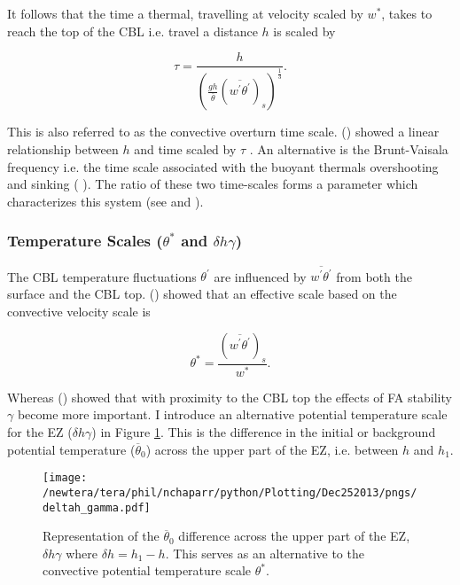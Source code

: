 It follows that the time a thermal, travelling at velocity scaled by $w^{*}$, takes to reach the top of the \acs{CBL} i.e. travel a distance $h$ is scaled by

\begin{equation}
\tau = \frac{h}{\left( \frac{gh}{\overline{\theta}}(\overline{w^{'}\theta^{'}})_{s} \right)^{\frac{1}{3}}}.
\end{equation}

 This is also referred to as the convective overturn time scale.  \citeauthor{SullMoengStev} (\citeyear{SullMoengStev}) 
showed a linear relationship between $h$ and time scaled by $\tau$ . An alternative is the Brunt-Vaisala frequency i.e. the time scale
 associated with the buoyant thermals overshooting and sinking (\citeauthor{FedConzMir04} \citeyear{FedConzMir04}).  The ratio of these two time-scales forms a parameter which characterizes this system (see \citeauthor{Sorbjan1}\citeyear{Sorbjan1} and \citeauthor{Deardorff79} \citeyear{Deardorff79}). 

\subsubsection{Temperature Scales ($\theta^{*}$ and $\delta h \gamma$)}
\label{subsubsec:tempscales}

The \acs{CBL} temperature fluctuations $\theta^{'}$ are influenced by $\overline{w^{'}\theta^{'}}$ from both the surface and the \acs{CBL} top.
\citeauthor {Deardorff70} (\citeyear{Deardorff70}) showed that an effective scale based on the convective velocity scale is

\begin{equation}
\theta^{*} = \frac{(\overline{w^{'}\theta^{'}})_{s}}{w^{*}}.
\end{equation} 

Whereas \citeauthor{Sorbjan1} (\citeyear{Sorbjan1}) showed that with proximity to the \acs{CBL} top the effects of \acs{FA} stability $\gamma$ become more important.  I introduce an alternative potential temperature scale for the \acs{EZ} ($\delta h \gamma$) in Figure \ref{fig:deltahgamma}. This is the difference in the initial or background potential temperature ($\overline{\theta}_{0}$) across the upper part of the \acs{EZ}, i.e. between $h$ and $h_{1}$.      

\begin{figure}[htbp]
    \centering
    \texttt{[image: /newtera/tera/phil/nchaparr/python/Plotting/Dec252013/pngs/deltah\_gamma.pdf]}
    \caption[Alternative Potential Temperature Scale for the \acs{EZ}]{Representation of the $\overline{\theta}_{0}$ difference across the upper part of the \acs{EZ}, $\delta h \gamma$ where $\delta h = h_{1} - h$. This serves as an alternative to the convective potential temperature scale $\theta^{*}$.}
    \label{fig:deltahgamma}   %
\end{figure}

